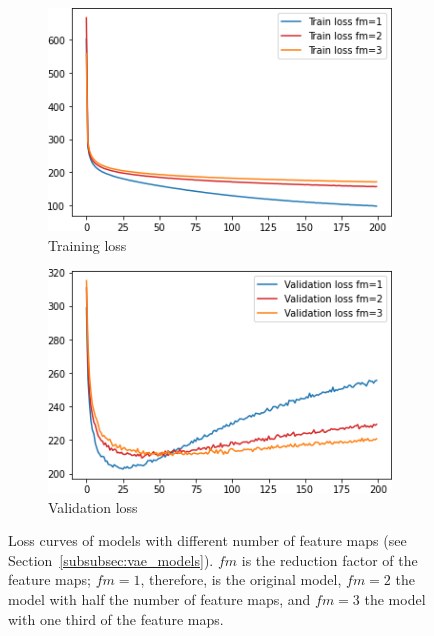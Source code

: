 \begin{figure}
    \centering
    \begin{subfigure}{.45\textwidth}
        \centering
        \includegraphics[width=\textwidth]{images/sparseness/sparseness_train_loss.png}
        \caption{Training loss}
    \end{subfigure}
    \hfill
    \begin{subfigure}{.45\textwidth}
        \centering
        \includegraphics[width=\textwidth]{images/sparseness/sparseness_validation_loss.png}
        \caption{Validation loss}
    \end{subfigure}
    \caption[Sparse Models - Loss Curves]{Loss curves of models with different number of feature maps (see Section~\ref{subsubsec:vae_models}). $fm$ is the reduction factor of the feature maps; $fm=1$, therefore, is the original model, $fm=2$ the model with half the number of feature maps, and $fm=3$ the model with one third of the feature maps.}
    \label{fig:learning_curves_sparseness}
\end{figure}

